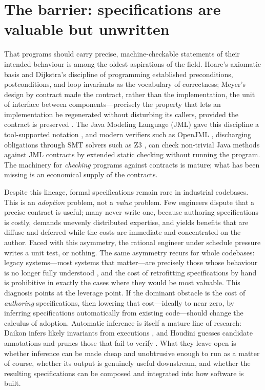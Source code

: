 \section{The barrier: specifications are valuable but unwritten}

That programs should carry precise, machine-checkable statements of their intended
behaviour is among the oldest aspirations of the field. Hoare's axiomatic basis
\citep{hoare1969axiomatic} and Dijkstra's discipline of programming
\citep{dijkstra1976discipline} established preconditions, postconditions, and loop
invariants as the vocabulary of correctness; Meyer's design by contract
\citep{meyer1992dbc} made the contract, rather than the implementation, the unit
of interface between components---precisely the property that lets an
implementation be regenerated without disturbing its callers, provided the
contract is preserved \citep{mostafa2017behavioral}. The Java Modeling Language
(JML) gave this discipline a tool-supported notation \citep{leavens2006jml}, and
modern verifiers such as OpenJML \citep{cok2014openjml}, discharging obligations
through SMT solvers such as Z3 \citep{demoura2008z3}, can check non-trivial Java
methods against JML contracts by extended static checking without running the
program. The machinery for \emph{checking} programs against contracts is mature;
what has been missing is an economical supply of the contracts.

Despite this lineage, formal specifications remain rare in industrial codebases.
This is an \emph{adoption} problem, not a \emph{value} problem. Few engineers
dispute that a precise contract is useful; many never write one, because authoring
specifications is costly, demands unevenly distributed expertise, and yields
benefits that are diffuse and deferred while the costs are immediate and
concentrated on the author. Faced with this asymmetry, the rational engineer under
schedule pressure writes a unit test, or nothing. The same asymmetry recurs for
whole codebases: legacy systems---most systems that matter---are precisely those
whose behaviour is no longer fully understood \citep{feathers2004legacy}, and the
cost of retrofitting specifications by hand is prohibitive in exactly the cases
where they would be most valuable. This diagnosis points at the leverage point. If
the dominant obstacle is the cost of \emph{authoring} specifications, then lowering
that cost---ideally to near zero, by inferring specifications automatically from
existing code---should change the calculus of adoption. Automatic inference is
itself a mature line of research: Daikon infers likely invariants from executions
\citep{ernst2007daikon}, and Houdini guesses candidate annotations and prunes
those that fail to verify \citep{flanagan2001houdini}. What they leave open is
whether inference can be made cheap and unobtrusive enough to run as a matter of
course, whether its output is genuinely useful downstream, and whether the
resulting specifications can be composed and integrated into how software is built.

